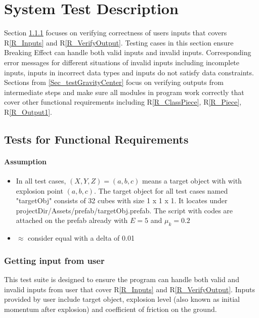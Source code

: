 \documentclass[12pt, titlepage]{article}
\newcommand{\rref}[1]{R\ref{#1}}
\begin{document}
	\section{System Test Description}
	
	Section \ref{Sec_TestInput} focuses on verifying correctness of users inputs that covers \rref{R_Inputs} and \rref{R_VerifyOutput}. Testing cases in this section ensure Breaking Effect can handle both valid inputs and invalid inputs. Corresponding error messages for different situations of invalid inputs including incomplete inputs, inputs in incorrect data types and inputs do not satisfy data constraints.\\  
	Sections from \ref{Sec_testGravityCenter} focus on verifying outputs from intermediate steps and make sure all modules in program work correctly that cover other functional requirements including \rref{R_ClassPiece}, \rref{R_Piece}, \rref{R_Output1}. 
	
	
	\subsection{Tests for Functional Requirements}
	
	\paragraph{Assumption}
	\begin{itemize}
		\item In all test cases, $(X,Y,Z) = (a,b,c)$ means a target object with with explosion point $(a,b,c)$. The target object for all test cases named "targetObj" consists of 32 cubes with size 1 x 1 x 1. It locates under projectDir/Assets/prefab/targetObj.prefab. The script with codes are attached on the prefab already with $E = 5$ and $\mu_{k} = 0.2$ 
		
		\item $\approx$ consider equal with a delta of 0.01
	\end{itemize}

	\subsubsection{Getting input from user}
	\label{Sec_TestInput}
	
	This test suite is designed to ensure the program can handle both valid and invalid inputs from user that cover \rref{R_Inputs} and \rref{R_VerifyOutput}. Inputs provided by user include target object, explosion level (also known as initial momentum after explosion) and coefficient of friction on the ground. 
	
\end{document}
